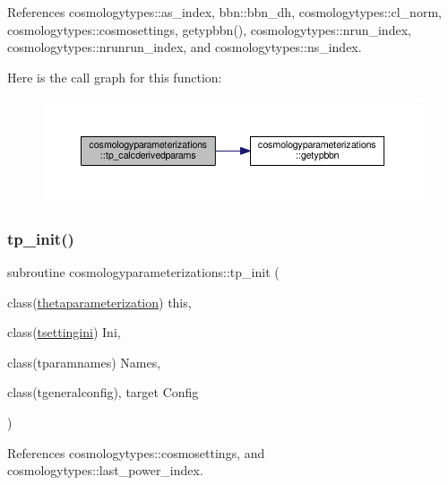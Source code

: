References cosmologytypes\+::as\+\_\+index, bbn\+::bbn\+\_\+dh, cosmologytypes\+::cl\+\_\+norm, cosmologytypes\+::cosmosettings, getypbbn(), cosmologytypes\+::nrun\+\_\+index, cosmologytypes\+::nrunrun\+\_\+index, and cosmologytypes\+::ns\+\_\+index.

Here is the call graph for this function\+:
\nopagebreak
\begin{figure}[H]
\begin{center}
\leavevmode
\includegraphics[width=350pt]{namespacecosmologyparameterizations_aeedc92b3479b3427db06f0770e7c13c0_cgraph}
\end{center}
\end{figure}
\mbox{\label{namespacecosmologyparameterizations_aa546897820fdf873fd19e45f5fe496e3}} 
\subsubsection{\texorpdfstring{tp\+\_\+init()}{tp\_init()}}
{\footnotesize\ttfamily subroutine cosmologyparameterizations\+::tp\+\_\+init (\begin{DoxyParamCaption}\item[{class(\mbox{\hyperlink{structcosmologyparameterizations_1_1thetaparameterization}{thetaparameterization}})}]{this,  }\item[{class(\mbox{\hyperlink{structsettings_1_1tsettingini}{tsettingini}})}]{Ini,  }\item[{class(tparamnames)}]{Names,  }\item[{class(tgeneralconfig), target}]{Config }\end{DoxyParamCaption})\hspace{0.3cm}{\ttfamily [private]}}



References cosmologytypes\+::cosmosettings, and cosmologytypes\+::last\+\_\+power\+\_\+index.

\mbox{\label{namespacecosmologyparameterizations_a7fdf867e0581b872103682d4364bc00c}} 
